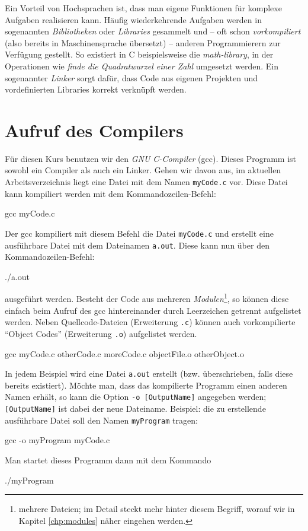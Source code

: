 Ein Vorteil von Hochsprachen ist, dass man eigene Funktionen für komplexe Aufgaben realisieren kann. Häufig wiederkehrende Aufgaben werden in sogenannten \emph{Bibliotheken} oder \emph{Libraries} gesammelt und -- oft schon \emph{vorkompiliert} (also bereits in Maschinensprache übersetzt) -- anderen Programmierern zur Verfügung gestellt. So existiert in C beispielsweise die  \emph{math-library}, in der Operationen wie \emph{finde die Quadratwurzel einer Zahl} umgesetzt werden. Ein sogenannter \emph{Linker} sorgt dafür, dass Code aus eigenen Projekten und vordefinierten Libraries korrekt verknüpft werden.

\section{Aufruf des Compilers} \label{sec:Compile}
Für diesen Kurs benutzen wir den \emph{GNU C-Compiler} (gcc). Dieses Programm ist sowohl ein Compiler als auch ein Linker. Gehen wir davon aus, im aktuellen Arbeitsverzeichnis liegt eine Datei mit dem Namen \texttt{myCode.c} vor. Diese Datei kann kompiliert werden mit dem Kommandozeilen-Befehl:
\begin{cmdbox}
gcc myCode.c
\end{cmdbox}

Der gcc kompiliert mit diesem Befehl die Datei \texttt{myCode.c} und erstellt eine ausführbare Datei mit dem Dateinamen \texttt{a.out}. Diese kann nun über den Kommandozeilen-Befehl:
\begin{cmdbox}
./a.out
\end{cmdbox}
ausgeführt werden. Besteht der Code aus mehreren \emph{Modulen}\footnote{\ie mehrere Dateien; im Detail steckt mehr hinter diesem Begriff, worauf wir in Kapitel \ref{chp:modules} näher eingehen werden.}, so können diese einfach beim Aufruf des gcc hintereinander durch Leerzeichen getrennt aufgelistet werden. Neben Quellcode-Dateien (Erweiterung \texttt{.c}) können auch vorkompilierte \enquote{Object Codes} (Erweiterung \texttt{.o}) aufgelistet werden.
\begin{cmdbox}
gcc myCode.c otherCode.c moreCode.c objectFile.o otherObject.o
\end{cmdbox}

In jedem Beispiel wird eine Datei \texttt{a.out} erstellt (bzw. überschrieben, falls diese bereits existiert). Möchte man, dass das kompilierte Programm einen anderen Namen erhält, so kann die Option \texttt{-o [OutputName]} angegeben werden; \texttt{[OutputName]} ist dabei der neue Dateiname. Beispiel: die zu erstellende ausführbare Datei soll den Namen \texttt{myProgram} tragen:
\begin{cmdbox}
gcc -o myProgram myCode.c
\end{cmdbox}
Man startet dieses Programm dann mit dem Kommando
\begin{cmdbox}
./myProgram
\end{cmdbox}

